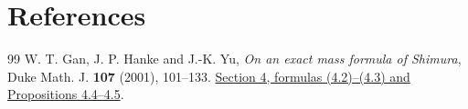 \documentclass[a4paper,11pt]{article}
\theoremstyle{definition}
\theoremstyle{remark}
\numberwithin{equation}{section}
\begin{document}
\clearpage
\section{References}\label{nav:bibliography-XXI}
\begingroup{}\begin{thebibliography}{99}\small
{} W. T. Gan, J. P. Hanke and J.-K. Yu, \emph{On an exact mass formula of Shimura}, Duke Math. J. \textbf{107} (2001), 101--133. \href{https://web.math.princeton.edu/~jonhanke/Web-02/Mass-Formula-of-Shimura/shimura-mass.pdf}{Section 4, formulas (4.2)--(4.3) and Propositions 4.4--4.5}.
\end{thebibliography}\endgroup
\end{document}
